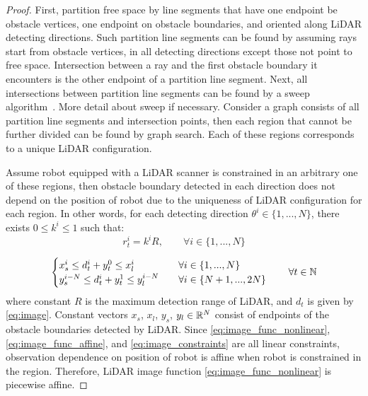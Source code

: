 \begin{proof}
    First, partition free space by line segments that have one endpoint be obstacle vertices, one endpoint on obstacle boundaries, 
    and oriented along LiDAR detecting directions.
    Such partition line segments can be found by assuming rays start from obstacle vertices,
    in all detecting directions except those not point to free space.
    Intersection between a ray and the first obstacle boundary it encounters is the other endpoint of a partition line segment.
    Next, all intersections between partition line segments can be found by a sweep algorithm~\cite{CGbook}. 
    {\color{blue} More detail about sweep if necessary.}
    Consider a graph consists of all partition line segments and intersection points,
    then each region that cannot be further divided can be found by graph search.
    Each of these regions corresponds to a unique LiDAR configuration.
    
    Assume robot equipped with a LiDAR scanner is constrained in an arbitrary one of these regions, 
    then obstacle boundary detected in each direction does not depend on the position of robot 
    due to the uniqueness of LiDAR configuration for each region.
    In other words, for each detecting direction $\theta^i \in \{1, ..., N\}$, there exists $0 \le k^i \le 1$ such that:
    \begin{equation}
        \label{eq:image_func_affine}
        r_t^i = k^i R, \qquad \forall i \in \{1, ..., N\}
    \end{equation}

    \begin{equation}
        \label{eq:image_constraints}
        \begin{cases} 
        x_{s}^i \le d_t^i + y_t^0 \le x_{l}^i & \quad \forall i \in \{1, ..., N\} \\
        y_{s}^{i-N} \le d_t^i + y_t^1 \le y_{l}^{i-N} & \quad \forall i \in \{N+1, ..., 2N\} 
        \end{cases}
        \qquad \forall t \in {\mathbb{N}}
    \end{equation} 
    where constant $R$ is the maximum detection range of LiDAR, and $d_t$ is given by \eqref{eq:image}.
    Constant vectors $x_{s}$, $x_{l}$, $y_{s}$, $y_{l} \in {\mathbb{R}}^N$ consist of endpoints of the obstacle boundaries detected by LiDAR.
    Since \eqref{eq:image_func_nonlinear}, \eqref{eq:image_func_affine}, and \eqref{eq:image_constraints}
    are all linear constraints, observation dependence on position of robot is affine when robot 
    is constrained in the region.
    Therefore, LiDAR image function \eqref{eq:image_func_nonlinear} is piecewise affine.
\end{proof}

